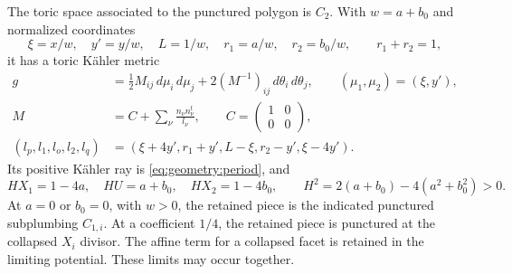 \begin{lemma}
\label{lem:geometry:toric}
The toric space associated to the punctured polygon is $C_2$.  With
$w=a+b_0$ and normalized coordinates
\begin{equation}
 \xi=x/w,\quad y'=y/w,\quad L=1/w,\quad
 r_1=a/w,\quad r_2=b_0/w,
 \qquad r_1+r_2=1,
 \label{eq:geometry:normalization}
\end{equation}
it has a toric K\"ahler metric
\begin{equation}
 \begin{split}
 g&=\tfrac12 M_{ij}\,d\mu_i\,d\mu_j
       +2(M^{-1})_{ij}\,d\theta_i\,d\theta_j,
       \qquad (\mu_1,\mu_2)=(\xi,y'),\\
 M&=C+\sum_{\nu}\frac{n_\nu n_\nu^t}{l_\nu},
       \qquad C=\begin{pmatrix}1&0\\0&0\end{pmatrix},\\
 (l_p,l_1,l_o,l_2,l_q)
   &=(\xi+4y',r_1+y',L-\xi,r_2-y',\xi-4y').
 \end{split}
 \label{eq:geometry:hessian}
\end{equation}
Its positive K\"ahler ray is \eqref{eq:geometry:period}, and
\begin{equation}
 HX_1=1-4a,\quad HU=a+b_0,\quad HX_2=1-4b_0,
 \qquad H^2=2(a+b_0)-4(a^2+b_0^2)>0.
 \label{eq:geometry:period-pairings}
\end{equation}
At $a=0$ or $b_0=0$, with $w>0$, the retained piece is the indicated
punctured subplumbing $C_{1,i}$.  At a coefficient $1/4$, the retained
piece is punctured at the collapsed $X_i$ divisor.  The affine term
for a collapsed facet is retained in the limiting potential.  These
limits may occur together.
\end{lemma}

